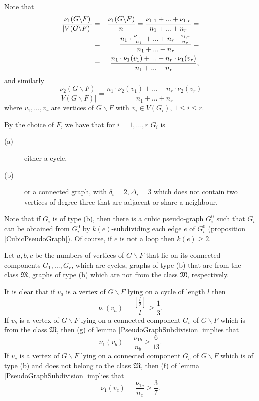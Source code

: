 \documentclass[fleqn,12pt,twoside]{article}
\newenvironment{proof}[1][Proof.]{\begin{trivlist}
\item[\hskip \labelsep {\bfseries #1}]}{\end{trivlist}}
\begin{document}
\begin{proof}
Note that
\begin{eqnarray}
\frac{\nu _{1}(G\backslash F)}{\left\vert V(G\backslash F)\right\vert } &=&\frac{\nu _{1}(G\backslash F)}{n}=\frac{\nu _{1,1}+...+\nu
_{1,r}}{n_1+...+n_r}=  \notag \\
&=&\frac{n_1 \cdot \frac{\nu _{1,1}}{n_1}+...+n_r \cdot \frac{\nu _{1,r}}{n_r }}{n_1+...+n_r}=  \notag \\
&=&\frac{n_1 \cdot \nu _{1}(v_{1})+...+n_r \cdot \nu
_{1}(v_{r})}{n_1+...+n_r}, \label{Nhu1Weight}
\end{eqnarray}and similarly
\begin{equation}
\frac{\nu _{2}(G\backslash F)}{\left\vert V(G\backslash F)\right\vert }=\frac{n_1 \cdot \nu _{2}(v_{1})+...+n_r \cdot \nu _{2}(v_{r})}{n_1
+...+n_r}  \label{Nhu2Weight}
\end{equation}where $v_{1},...,v_{r}$ are vertices of $G\backslash F$ with
$v_{i}\in V(G_{i})$, $1\leq i\leq r$.

By the choice of $F$, we have that for $i=1,...,r$ $G_{i}$ is

\begin{description}
\item[(a)] either a cycle,

\item[(b)] or a connected graph, with $\delta_{i}=2,\Delta_{i}=3$
which does not contain two vertices of degree three that are
adjacent or share a neighbour.
\end{description}

Note that if $G_{i}$ is of type (b), then there is a cubic pseudo-graph $G_{i}^{0}$ such that $G_{i}$ can be obtained from $G_{i}^{0}$ by $k(e)$-subdividing each edge $e$ of $G_{i}^{0}$ (proposition \ref{CubicPseudoGraph}). Of course, if $e$ is not a loop then $k(e)\geq 2$.

Let $a,b,c$ be the numbers of vertices of $G\backslash F$ that lie
on its connected components $G_{1},...,G_{r}$, which are cycles,
graphs of type (b) that are from the class $\mathfrak{M}$, graphs of
type (b) which are not from the class $\mathfrak{M}$, respectively.

It is clear that if $v_{a}$ is a vertex of $G\backslash F$ lying on
a cycle of length $l$ then
\begin{equation*}
\nu _{1}(v_{a})=\frac{\left[ \frac{l}{2}\right] }{l}\geq
\frac{1}{3}\text{.}
\end{equation*}If $v_{b}$ is a vertex of $G\backslash F$ lying on a connected component $G_{b}$ of $G\backslash F$ which is from the class $\mathfrak{M}$,
then (g) of lemma \ref{PseudoGraphSubdivision} implies that
\begin{equation*}
\nu _{1}(v_{b})=\frac{\nu _{1b}}{n_b}\geq \frac{6}{13}.
\end{equation*}If $v_{c}$ is a vertex of $G\backslash F$ lying on a connected component $G_{c}$ of $G\backslash F$ which is of type (b) and does not belong
to the class $\mathfrak{M}$, then (f) of lemma
\ref{PseudoGraphSubdivision} implies
that\begin{equation*}
\nu _{1}(v_{c})=\frac{\nu _{1c}}{n_c}\geq \frac{3}{7}\text{.}
\end{equation*}


\end{proof}
\end{document}
